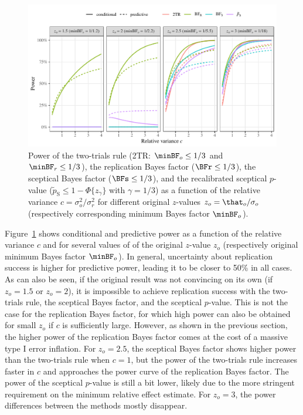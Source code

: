 \begin{figure}
\begin{knitrout}
\color{fgcolor}
\includegraphics[width=\maxwidth]{images/paper1/power-plots-1}
\end{knitrout}
\caption{Power of the two-trials rule (2TR: $\minBF_{o} \leq
1/3$ and $\minBF_{r} \leq
1/3$), the replication Bayes factor ($\BFr
\leq 1/3$), the sceptical Bayes factor ($\BFs
\leq
1/3$), and the recalibrated sceptical $p$-value ($\tilde{p}_{\mathrm{S}}
\leq 1 - \Phi\{z_{\gamma}\}$ with $\gamma =
1/3$) as a function of the relative variance $c
= \sigma^2_o/\sigma^2_r$ for different original $z$-values $z_o =
\that_o/\sigma_o$ (respectively corresponding minimum Bayes factor $\minBF_o$).}
\label{fig1:condpower}
\end{figure}

Figure~\ref{fig1:condpower} shows conditional and predictive power as a function
of the relative variance $c$ and for several values of of the original $z$-value
$z_o$ (respectively original minimum Bayes factor $\minBF_{o}$). In general,
uncertainty about replication success is higher for predictive power, leading it
to be closer to 50\% in all cases. As can also be seen, if the original result
was not convincing on its own (\eg if $z_o = 1.5$ or $z_{o} = 2$), it is
impossible to achieve replication success with the two-trials rule, the
sceptical Bayes factor, and the sceptical $p$-value. This is not the case for
the replication Bayes factor, for which high power can also be obtained for
small $z_o$ if $c$ is sufficiently large. However, as shown in the previous
section, the higher power of the replication Bayes factor comes at the cost of a
massive type I error inflation. For $z_o = 2.5$, the sceptical Bayes factor
shows higher power than the two-trials rule when $c = 1$, but the power of the
two-trials rule increases faster in $c$ and approaches the power curve of the
replication Bayes factor. The power of the sceptical $p$-value is still a bit
lower, likely due to the more stringent requirement on the minimum relative
effect estimate. For $z_{o} = 3$, the power differences between the methods
mostly disappear.


